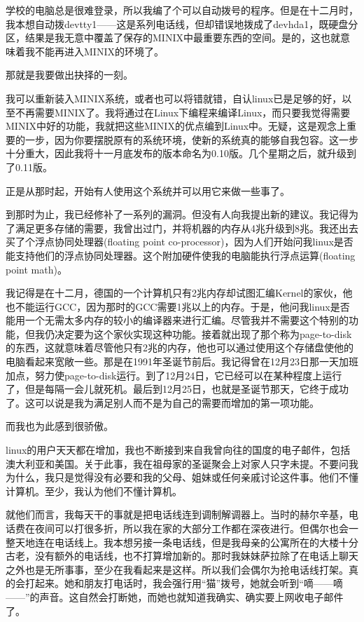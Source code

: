学校的电脑总是很难登录，所以我编了个可以自动拨号的程序。但是在十二月时，我本想自动拨devtty1——这是系列电话线，但却错误地拨成了devhda1，既硬盘分区，结果是我无意中覆盖了保存的MINIX中最重要东西的空间。是的，这也就意味着我不能再进入MINIX的环境了。

那就是我要做出抉择的一刻。

我可以重新装入MINIX系统，或者也可以将错就错，自认linux已是足够的好，以至不再需要MINIX了。我将通过在Linux下编程来编译Linux，而只要我觉得需要MINIX中好的功能，我就把这些MINIX的优点编到Linux中。无疑，这是观念上重要的一步，因为你要摆脱原有的系统环境，使新的系统真的能够自我包容。这一步十分重大，因此我将十一月底发布的版本命名为0.10版。几个星期之后，就升级到了0.11版。

正是从那时起，开始有人使用这个系统并可以用它来做一些事了。

到那时为止，我已经修补了一系列的漏洞。但没有人向我提出新的建议。我记得为了满足更多存储的需要，我曾出过门，并将机器的内存从4兆升级到8兆。我还出去买了个浮点协同处理器(floating point co-processor)，因为人们开始问我linux是否能支持他们的浮点协同处理器。这个附加硬件使我的电脑能执行浮点运算(floating point math)。

我记得是在十二月，德国的一个计算机只有2兆内存却试图汇编Kernel的家伙，他也不能运行GCC，因为那时的GCC需要1兆以上的内存。于是，他问我linux是否能用一个无需太多内存的较小的编译器来进行汇编。尽管我并不需要这个特别的功能，但我仍决定要为这个家伙实现这种功能。接着就出现了那个称为page-to-disk的东西，这就意味着尽管他只有2兆的内存，他也可以通过使用这个存储盘使他的电脑看起来宽敞一些。那是在1991年圣诞节前后。我记得曾在12月23日那一天加班加点，努力使page-to-disk运行。到了12月24日，它已经可以在某种程度上运行了，但是每隔一会儿就死机。最后到12月25日，也就是圣诞节那天，它终于成功了。这可以说是我为满足别人而不是为自己的需要而增加的第一项功能。

而我也为此感到很骄傲。

 

linux的用户天天都在增加，我也不断接到来自我曾向往的国度的电子邮件，包括澳大利亚和美国。关于此事，我在祖母家的圣诞聚会上对家人只字未提。不要问我为什么，我只是觉得没有必要和我的父母、姐妹或任何亲戚讨论这件事。他们不懂计算机。至少，我认为他们不懂计算机。

就他们而言，我每天干的事就是把电话线连到调制解调器上。当时的赫尔辛基，电话费在夜间可以打很多折，所以我在家的大部分工作都在深夜进行。但偶尔也会一整天地连在电话线上。我本想另接一条电话线，但是我母亲的公寓所在的大楼十分古老，没有额外的电话线，也不打算增加新的。那时我妹妹萨拉除了在电话上聊天之外也是无所事事，至少在我看起来是这样。所以我们会偶尔为抢电话线打架。真的会打起来。她和朋友打电话时，我会强行用“猫”拨号，她就会听到“嘀——嘀——”的声音。这自然会打断她，而她也就知道我确实、确实要上网收电子邮件了。

